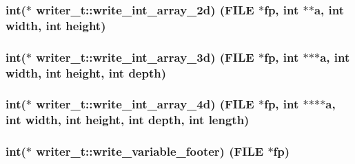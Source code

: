 \subsubsection[{\texorpdfstring{write\+\_\+int\+\_\+array\+\_\+2d}{write_int_array_2d}}]{\setlength{\rightskip}{0pt plus 5cm}int($\ast$ writer\+\_\+t\+::write\+\_\+int\+\_\+array\+\_\+2d) (F\+I\+LE $\ast$fp, int $\ast$$\ast$a, int width, int height)}\hypertarget{structwriter__t_a70bc983d3bb23234726a11eaae17a3fa}{}\label{structwriter__t_a70bc983d3bb23234726a11eaae17a3fa}
\subsubsection[{\texorpdfstring{write\+\_\+int\+\_\+array\+\_\+3d}{write_int_array_3d}}]{\setlength{\rightskip}{0pt plus 5cm}int($\ast$ writer\+\_\+t\+::write\+\_\+int\+\_\+array\+\_\+3d) (F\+I\+LE $\ast$fp, int $\ast$$\ast$$\ast$a, int width, int height, int depth)}\hypertarget{structwriter__t_a6c3b911dd02e131c7e995c013ab4bf99}{}\label{structwriter__t_a6c3b911dd02e131c7e995c013ab4bf99}
\subsubsection[{\texorpdfstring{write\+\_\+int\+\_\+array\+\_\+4d}{write_int_array_4d}}]{\setlength{\rightskip}{0pt plus 5cm}int($\ast$ writer\+\_\+t\+::write\+\_\+int\+\_\+array\+\_\+4d) (F\+I\+LE $\ast$fp, int $\ast$$\ast$$\ast$$\ast$a, int width, int height, int depth, int length)}\hypertarget{structwriter__t_a60f59670eb1829ef88ff94de402685f8}{}\label{structwriter__t_a60f59670eb1829ef88ff94de402685f8}
\subsubsection[{\texorpdfstring{write\+\_\+variable\+\_\+footer}{write_variable_footer}}]{\setlength{\rightskip}{0pt plus 5cm}int($\ast$ writer\+\_\+t\+::write\+\_\+variable\+\_\+footer) (F\+I\+LE $\ast$fp)}\hypertarget{structwriter__t_afd5340cc6c2116fda29a70332fe765f4}{}\label{structwriter__t_afd5340cc6c2116fda29a70332fe765f4}

